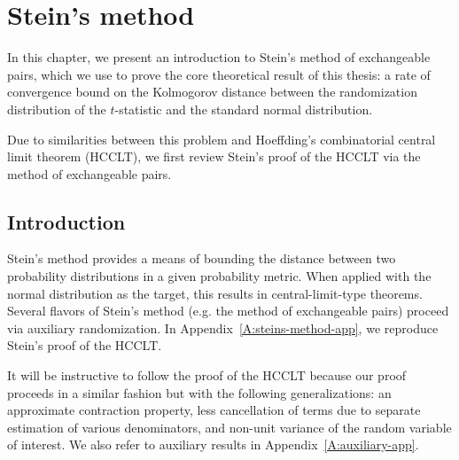 \chapter{Stein's method}
\label{C:steins-method}
In this chapter, we present an introduction to
Stein's method of exchangeable pairs, which we use to prove the core
theoretical result of this thesis: a rate of convergence bound on the
Kolmogorov distance between the randomization distribution of the $t$-statistic
and the standard normal distribution.

Due to similarities between this problem and Hoeffding's combinatorial central
limit theorem (HCCLT), we first review Stein's proof of the HCCLT via the method
of exchangeable pairs.


\section{Introduction}
\label{S:steins-method-introduction} Stein's method provides a means
of bounding the distance between two probability distributions in a
given probability metric.  When applied with the normal distribution
as the target, this results in central-limit-type theorems.  Several
flavors of Stein's method (e.g. the method of exchangeable pairs)
proceed via auxiliary randomization.  In Appendix~\ref{A:steins-method-app},
we reproduce Stein's \cite{stein1986approximate} proof of the HCCLT.

It will be instructive to follow the proof of the HCCLT
because our proof proceeds in a similar fashion but with the following
generalizations: an approximate contraction property, less
cancellation of terms due to separate estimation of various
denominators, and non-unit variance of the random variable of interest.
We also refer to auxiliary results in Appendix~\ref{A:auxiliary-app}.

